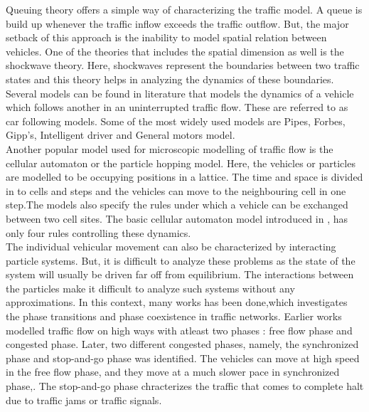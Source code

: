 \documentclass[a4paper,12pt]{scrartcl}
\begin{document}
Queuing theory offers a simple way of characterizing the traffic model. 
A queue is build up whenever the traffic inflow exceeds the traffic outflow. 
But, the major setback of this approach is the inability to model spatial relation between vehicles. One of the theories that includes the spatial dimension as well is the shockwave theory.
Here, shockwaves represent the boundaries between two traffic states and this theory helps in analyzing the dynamics of these boundaries.\\

Several models can be found in literature that models the dynamics of a vehicle which follows another in an uninterrupted traffic flow. These are referred to as car following models\cite{chakroborty1999TRET}.
Some of the most widely used models are Pipes, Forbes, Gipp's, Intelligent driver and General motors model. \\

Another popular model used for microscopic modelling of traffic flow is the cellular automaton or the particle hopping model\cite{chowdhury2000PR}. Here, the vehicles or particles are modelled to be occupying positions in a lattice. The time and space is divided in to cells and steps and the vehicles can move to the neighbouring cell in one step.The models also specify the rules under which a vehicle can be exchanged between two cell sites. The basic cellular automaton model introduced in \cite{nagel1992EDP}, has only four rules controlling these dynamics.\\

The individual vehicular movement can also be characterized by interacting particle systems. But, it is difficult to analyze these problems as the state of the system will usually be driven far off from equilibrium. The interactions between the particles make it difficult to analyze such systems without any approximations. In this context, many works has been done,which investigates the phase transitions and phase coexistence in traffic networks\cite{dal2017MMAS}. Earlier works modelled traffic flow on high ways with atleast two phases : free flow phase and congested phase. Later, two different congested phases, namely, the synchronized phase and stop-and-go phase was identified. The vehicles can move at high speed in the free flow phase, and they move at a much slower pace in synchronized phase,. The stop-and-go phase chracterizes the traffic that comes to complete halt due to traffic jams or traffic signals.\\
\end{document}

